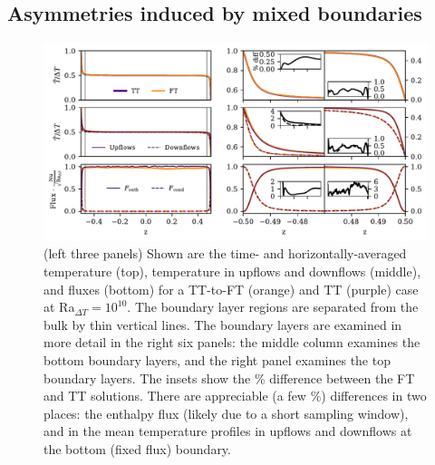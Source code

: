 \documentclass[aps, pre, onecolumn, nofootinbib, notitlepage, groupedaddress, amsfonts, amssymb, amsmath, longbibliography, superscriptaddress]{revtex4-1}
\begin{document}
\subsection{Asymmetries induced by mixed boundaries}
\label{sec:asymmetries}

\begin{figure}
\includegraphics[width=\textwidth]{./figs/rbc_1D_profiles.pdf}
\caption{ 
	(left three panels) Shown are the time- and horizontally-averaged temperature (top), temperature in upflows and downflows (middle), and fluxes (bottom) for a TT-to-FT (orange) and TT (purple) case at Ra$_{\Delta T} = 10^{10}$.
	The boundary layer regions are separated from the bulk by thin vertical lines.
	The boundary layers are examined in more detail in the right six panels: the middle column examines the bottom boundary layers, and the right panel examines the top boundary layers.
	The insets show the \% difference between the FT and TT solutions.
	There are appreciable (a few \%) differences in two places: the enthalpy flux (likely due to a short sampling window), and in the mean temperature profiles in upflows and downflows at the bottom (fixed flux) boundary.	
\label{fig:rbc_1D_profiles} }
\end{figure}
\end{document}

